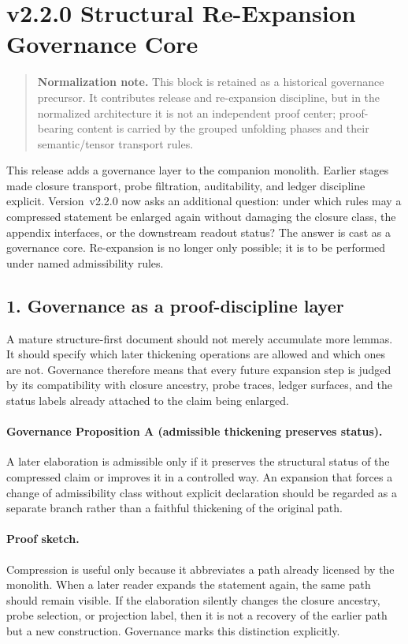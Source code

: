 \section*{v2.2.0 Structural Re-Expansion Governance Core}
\begin{quote}
\textbf{Normalization note.} This block is retained as a historical governance precursor. It contributes release and re-expansion discipline, but in the normalized architecture it is not an independent proof center; proof-bearing content is carried by the grouped unfolding phases and their semantic/tensor transport rules.
\end{quote}

This release adds a governance layer to the companion monolith. Earlier stages
made closure transport, probe filtration, auditability, and ledger discipline
explicit. Version~v2.2.0 now asks an additional question: under which
rules may a compressed statement be enlarged again without damaging the closure
class, the appendix interfaces, or the downstream readout status? The answer is
cast as a governance core. Re-expansion is no longer only possible; it is to be
performed under named admissibility rules.

\subsection*{1. Governance as a proof-discipline layer}
A mature structure-first document should not merely accumulate more lemmas. It
should specify which later thickening operations are allowed and which ones are
not. Governance therefore means that every future expansion step is judged by
its compatibility with closure ancestry, probe traces, ledger surfaces, and the
status labels already attached to the claim being enlarged.

\paragraph{Governance Proposition A (admissible thickening preserves status).}
A later elaboration is admissible only if it preserves the structural status of
the compressed claim or improves it in a controlled way. An expansion that
forces a change of admissibility class without explicit declaration should be
regarded as a separate branch rather than a faithful thickening of the original
path.

\paragraph{Proof sketch.}
Compression is useful only because it abbreviates a path already licensed by the
monolith. When a later reader expands the statement again, the same path should
remain visible. If the elaboration silently changes the closure ancestry, probe
selection, or projection label, then it is not a recovery of the earlier path
but a new construction. Governance marks this distinction explicitly.

